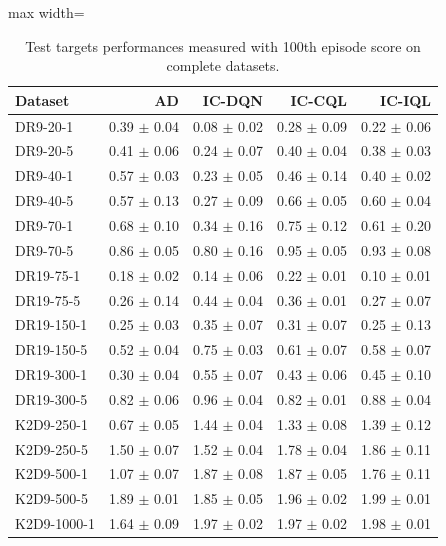 \documentclass{article}
\begin{document}
\begin{table}[ht]
    \label{tab:}
    \begin{center}
    \caption{Test targets performances measured with 100th episode score on complete datasets.}
    \begin{small}
    \begin{adjustbox}{max width=\columnwidth}
		\begin{tabular}{l|rrrr}
		\toprule
	\textbf{Dataset} & \textbf{AD} & \textbf{IC-DQN} & \textbf{IC-CQL} & \textbf{IC-IQL}\\
\midrule
DR9-20-1 & 0.39 $\pm$ 0.04 & 0.08 $\pm$ 0.02 & 0.28 $\pm$ 0.09 & 0.22 $\pm$ 0.06\\
DR9-20-5 & 0.41 $\pm$ 0.06 & 0.24 $\pm$ 0.07 & 0.40 $\pm$ 0.04 & 0.38 $\pm$ 0.03\\
DR9-40-1 & 0.57 $\pm$ 0.03 & 0.23 $\pm$ 0.05 & 0.46 $\pm$ 0.14 & 0.40 $\pm$ 0.02\\
DR9-40-5 & 0.57 $\pm$ 0.13 & 0.27 $\pm$ 0.09 & 0.66 $\pm$ 0.05 & 0.60 $\pm$ 0.04\\
DR9-70-1 & 0.68 $\pm$ 0.10 & 0.34 $\pm$ 0.16 & 0.75 $\pm$ 0.12 & 0.61 $\pm$ 0.20\\
DR9-70-5 & 0.86 $\pm$ 0.05 & 0.80 $\pm$ 0.16 & 0.95 $\pm$ 0.05 & 0.93 $\pm$ 0.08\\
DR19-75-1 & 0.18 $\pm$ 0.02 & 0.14 $\pm$ 0.06 & 0.22 $\pm$ 0.01 & 0.10 $\pm$ 0.01\\
DR19-75-5 & 0.26 $\pm$ 0.14 & 0.44 $\pm$ 0.04 & 0.36 $\pm$ 0.01 & 0.27 $\pm$ 0.07\\
DR19-150-1 & 0.25 $\pm$ 0.03 & 0.35 $\pm$ 0.07 & 0.31 $\pm$ 0.07 & 0.25 $\pm$ 0.13\\
DR19-150-5 & 0.52 $\pm$ 0.04 & 0.75 $\pm$ 0.03 & 0.61 $\pm$ 0.07 & 0.58 $\pm$ 0.07\\
DR19-300-1 & 0.30 $\pm$ 0.04 & 0.55 $\pm$ 0.07 & 0.43 $\pm$ 0.06 & 0.45 $\pm$ 0.10\\
DR19-300-5 & 0.82 $\pm$ 0.06 & 0.96 $\pm$ 0.04 & 0.82 $\pm$ 0.01 & 0.88 $\pm$ 0.04\\
K2D9-250-1 & 0.67 $\pm$ 0.05 & 1.44 $\pm$ 0.04 & 1.33 $\pm$ 0.08 & 1.39 $\pm$ 0.12\\
K2D9-250-5 & 1.50 $\pm$ 0.07 & 1.52 $\pm$ 0.04 & 1.78 $\pm$ 0.04 & 1.86 $\pm$ 0.11\\
K2D9-500-1 & 1.07 $\pm$ 0.07 & 1.87 $\pm$ 0.08 & 1.87 $\pm$ 0.05 & 1.76 $\pm$ 0.11\\
K2D9-500-5 & 1.89 $\pm$ 0.01 & 1.85 $\pm$ 0.05 & 1.96 $\pm$ 0.02 & 1.99 $\pm$ 0.01\\
K2D9-1000-1 & 1.64 $\pm$ 0.09 & 1.97 $\pm$ 0.02 & 1.97 $\pm$ 0.02 & 1.98 $\pm$ 0.01\\

\end{tabular}
\end{adjustbox}
\end{small}
\end{center}
\end{table}
\end{document}
